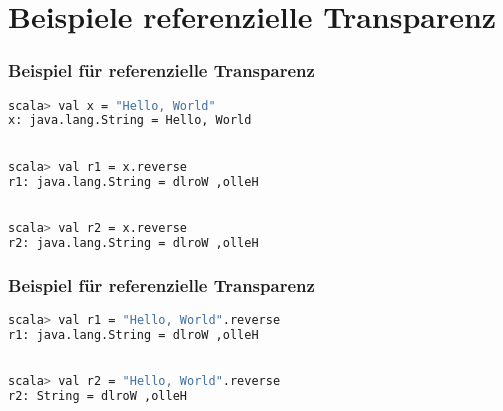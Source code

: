 	\section[Section]{Beispiele referenzielle Transparenz}
	\begin{frame}[fragile]
		\frametitle{Beispiel für referenzielle Transparenz}
		\begin{lstlisting}[language=bash]
scala> val x = "Hello, World"
x: java.lang.String = Hello, World 

		
scala> val r1 = x.reverse 
r1: java.lang.String = dlroW ,olleH 

		
scala> val r2 = x.reverse 
r2: java.lang.String = dlroW ,olleH 
\end{lstlisting}	
\end{frame}
	\begin{frame}[fragile]
		\frametitle{Beispiel für referenzielle Transparenz}
		\begin{lstlisting}[language=bash]
scala> val r1 = "Hello, World".reverse
r1: java.lang.String = dlroW ,olleH 

		
scala> val r2 = "Hello, World".reverse 
r2: String = dlroW ,olleH 
		
\end{lstlisting}
\end{frame}